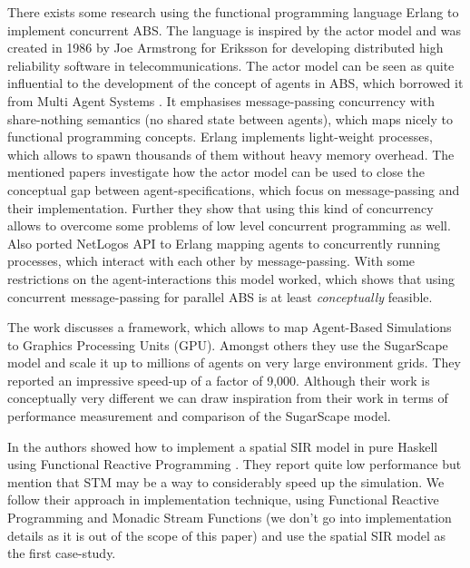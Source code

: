 There exists some research \cite{di_stefano_using_2005, varela_modelling_2004, sher_agent-based_2013} using the functional programming language Erlang \cite{armstrong_erlang_2010} to implement concurrent ABS. The language is inspired by the actor model \cite{agha_actors:_1986} and was created in 1986 by Joe Armstrong for Eriksson for developing distributed high reliability software in telecommunications. The actor model can be seen as quite influential to the development of the concept of agents in ABS, which borrowed it from Multi Agent Systems \cite{wooldridge_introduction_2009}. It emphasises message-passing concurrency with share-nothing semantics (no shared state between agents), which maps nicely to functional programming concepts. Erlang implements light-weight processes, which allows to spawn thousands of them without heavy memory overhead. The mentioned papers investigate how the actor model can be used to close the conceptual gap between agent-specifications, which focus on message-passing and their implementation. Further they show that using this kind of concurrency allows to overcome some problems of low level concurrent programming as well.
Also \cite{bezirgiannis_improving_2013} ported NetLogos API to Erlang mapping agents to concurrently running processes, which interact with each other by message-passing. With some restrictions on the agent-interactions this model worked, which shows that using concurrent message-passing for parallel ABS is at least \textit{conceptually} feasible.

The work \cite{lysenko_framework_2008} discusses a framework, which allows to map Agent-Based Simulations to Graphics Processing Units (GPU). Amongst others they use the SugarScape model \cite{epstein_growing_1996} and scale it up to millions of agents on very large environment grids. They reported an impressive speed-up of a factor of 9,000. Although their work is conceptually very different we can draw inspiration from their work in terms of performance measurement and comparison of the SugarScape model.

In \cite{thaler_pure_2019} the authors showed how to implement a spatial SIR model in pure Haskell using Functional Reactive Programming \cite{hudak_arrows_2003}. They report quite low performance but mention that STM may be a way to considerably speed up the simulation. We follow their approach in implementation technique, using Functional Reactive Programming and Monadic Stream Functions \cite{perez_functional_2016} (we don't go into implementation details as it is out of the scope of this paper) and use the spatial SIR model as the first case-study.

